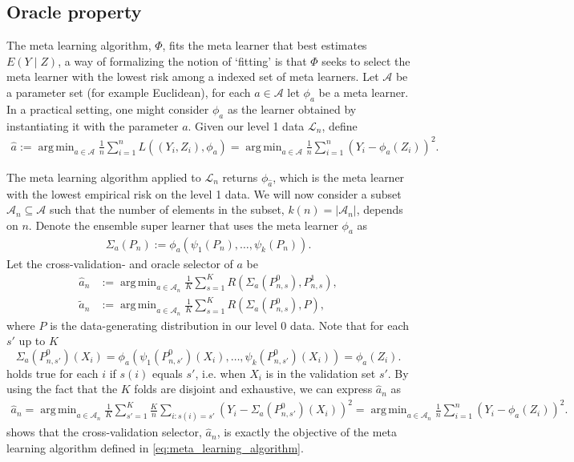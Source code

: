 \documentclass[11pt, a4paper]{article}
\theoremstyle{definition}
\theoremstyle{remark}
\DeclareMathOperator*{\argmin}{arg\,min}
\newcommand{\ml}{k}
\newcommand{\la}{\psi}
\newcommand{\lone}{\mathcal{L}}
\newcommand{\meta}{\phi}
\newcommand{\Meta}{\Phi}
\newcommand{\esl}{\Sigma}
\begin{document}
\subsection{Oracle property}
The meta learning algorithm, $ \Meta $, fits the meta learner that best estimates $ E(Y \mid Z) $, a way of formalizing the notion of `fitting' is that $ \Meta $ seeks to select the meta learner with the lowest risk among a indexed set of meta learners. Let $ \mathcal{A} $ be a parameter set (for example Euclidean), for each $ a \in \mathcal{A} $ let $ \meta_{a} $ be a meta learner. In a practical setting, one might consider $ \meta_{a} $ as the learner obtained by instantiating it with the parameter $ a $. Given our level 1 data $ \lone_{n} $, define 
\begin{align} \label{eq:meta_learning_algorithm}
    \hat{a} := \argmin_{a \in \mathcal{A}} \frac{1}{n} \sum_{i = 1}^{n} L((Y_i, Z_i), \meta_{a}) = \argmin_{a \in \mathcal{A}} \frac{1}{n} \sum_{i = 1}^{n} (Y_i - \meta_{a}(Z_i))^2.
\end{align}

The meta learning algorithm applied to $ \lone_{n} $ returns $ \meta_{ \hat{a} } $, which is the meta learner with the lowest empirical risk on the level 1 data. We will now consider a subset $ \mathcal{A}_n \subseteq \mathcal{A} $ such that the number of elements in the subset, $ \ml(n) = |\mathcal{A}_{n}| $, depends on $ n $. Denote the ensemble super learner that uses the meta learner $ \meta_{ a } $ as 
\begin{align*}
    \esl_{a}(P_{n}) := \meta_{a}(\la_1(P_{n}), \ldots, \la_k(P_{n})).
\end{align*}
Let the cross-validation- and oracle selector of $ a $ be 
\begin{align*}
    \hat{a}_n &:= \argmin_{a \in \mathcal{A}_{n}} \frac{1}{K} \sum_{s = 1}^{K} R(\esl_{a}(P_{n, s}^{0}), P_{n, s}^{1}), \\
    \tilde{a}_n &:= \argmin_{a \in \mathcal{A}_n} \frac{1}{K} \sum_{s = 1}^{K} R(\esl_{a}(P_{n, s}^{0}) , P),
\end{align*}
where $ P $ is the data-generating distribution in our level 0 data. Note that for each $ s' $ up to $ K $ 
$$ \esl_a(P_{n, s'}^{0})(X_i) = \meta_{a}(\la_{1}(P_{n, s'}^{0})(X_i) , \dots , \la_{\ml}(P_{n, s'}^{0})(X_i) ) = \meta_{a}(Z_i). $$ 
holds true for each $ i $ if $ s(i)$ equals $ s' $, i.e. when $ X_i $ is in the validation set $ s' $. By using the fact that the $ K $ folds are disjoint and exhaustive, we can express $ \hat{a}_n $ as  
\begin{align} \label{eq:meta_learning_algorithm_cv}
    \hat{a}_n = \argmin_{a \in \mathcal{A}_n} \frac{1}{K} \sum_{s' = 1}^{K} \frac{K}{n} \sum_{i: s(i) = s'} (Y_i - \esl_{a}(P_{n,s'}^{0}) (X_i))^2 = \argmin_{a \in \mathcal{A}_n} \frac{1}{n} \sum_{i = 1}^{n} (Y_i - \meta_{a}(Z_i))^2.
\end{align}
 shows that the cross-validation selector, $ \hat{a}_n $, is exactly the objective of the meta learning algorithm defined in \eqref{eq:meta_learning_algorithm}. 
\end{document}
